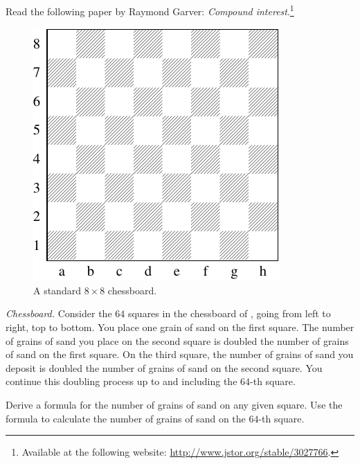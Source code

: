 \documentclass[a4paper,oneside,12pt]{article}
\begin{document}
\begin{problem}
\item Read the following paper by Raymond Garver:
  \emph{Compound interest}.\footnote{
    Available at the following website:
    \url{http://www.jstor.org/stable/3027766}.
  }

\begin{figure}[!htbp]
\centering
\includegraphics[scale=1.1]{image/11/chessboard.pdf}
\caption{%
  A standard $8 \times 8$ chessboard.
}
\label{fig:chessboard}
\end{figure}

\item\emph{Chessboard.}
  Consider the $64$ squares in the chessboard of
  , going from left to right, top to bottom.
  You place one grain of sand on the first square.  The number of
  grains of sand you place on the second square is doubled the number
  of grains of sand on the first square.  On the third square, the
  number of grains of sand you deposit is doubled the number of grains
  of sand on the second square.  You continue this doubling process up
  to and including the $64$-th square.
  \begin{packedenum}
  \item\label{subprob:sand_formula}
    Derive a formula for the number of grains of sand on any given
    square.  Use the formula to calculate the number of grains of sand
    on the $64$-th square.


\end{packedenum}
\end{problem}
\end{document}
